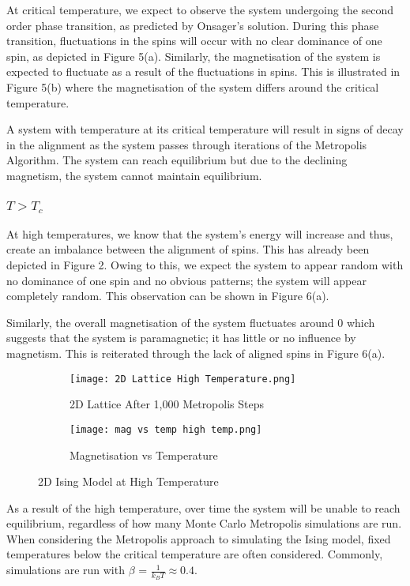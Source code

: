 \documentclass[a4paper]{article}
\begin{document}
At critical temperature, we expect to observe the system undergoing the second order phase transition, as predicted by Onsager's solution. During this phase transition, fluctuations in the spins will occur with no clear dominance of one spin, as depicted in Figure 5(a). Similarly, the magnetisation of the system is expected to fluctuate as a result of the fluctuations in spins. This is illustrated in Figure 5(b) where the magnetisation of the system differs around the critical temperature. 

A system with temperature at its critical temperature will result in signs of decay in the alignment as the system passes through iterations of the Metropolis Algorithm. The system can reach equilibrium but due to the declining magnetism, the system cannot maintain equilibrium.

\subsubsection{$T > T_{c}$}

At high temperatures, we know that the system's energy will increase and thus, create an imbalance between the alignment of spins. This has already been depicted in Figure 2. Owing to this, we expect the system to appear random with no dominance of one spin and no obvious patterns; the system will appear completely random. This observation can be shown in Figure 6(a). 

Similarly, the overall magnetisation of the system fluctuates around 0 which suggests that the system is paramagnetic; it has little or no influence by magnetism. This is reiterated through the lack of aligned spins in Figure 6(a). 

\begin{figure}[h]
\centering
\begin{subfigure}{0.37\textwidth}
\texttt{[image: 2D Lattice High Temperature.png]} 
\caption{2D Lattice After 1,000 Metropolis Steps}
\label{fig:subim1}
\end{subfigure}
\begin{subfigure}{0.5\textwidth}
\texttt{[image: mag vs temp high temp.png]}
\caption{Magnetisation vs Temperature}
\label{fig:subim2}
\end{subfigure}
\caption{2D Ising Model at High Temperature}
\label{fig:image2}
\end{figure}

As a result of the high temperature, over time the system will be unable to reach equilibrium, regardless of how many Monte Carlo Metropolis simulations are run. When considering the Metropolis approach to simulating the Ising model, fixed temperatures below the critical temperature are often considered. Commonly, simulations are run with $\beta$ = $\frac{1}{k_{B}T} \approx 0.4$.
\end{document}
